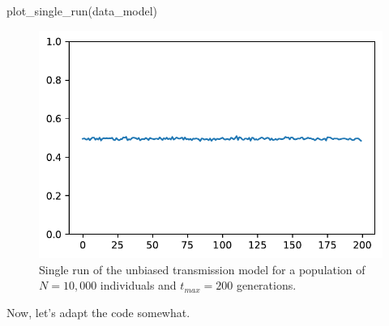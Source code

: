 \documentclass[
  a4paperpaper,
  ,captions=tableheading
]{scrbook}
\newenvironment{Shaded}{\begin{snugshade}}{\end{snugshade}}
\newcommand{\NormalTok}[1]{\textcolor[rgb]{0.00,0.23,0.31}{#1}}
\begin{document}
\begin{Shaded}
\begin{Highlighting}[]
\NormalTok{plot\_single\_run(data\_model)}
\end{Highlighting}
\end{Shaded}

\begin{figure}[H]

{\centering \includegraphics{chapter03_files/figure-pdf/cell-20-output-1.pdf}

}

\caption{Single run of the unbiased transmission model for a population
of \(N=10,000\) individuals and \(t_{max}=200\) generations.}

\end{figure}

Now, let's adapt the code somewhat.
\end{document}

